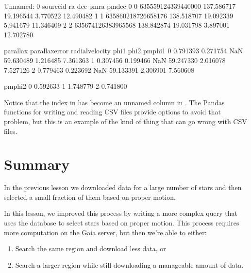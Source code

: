\documentclass[letterpaper,10pt,english]{sphinxmanual}
\begin{document}
\begin{sphinxVerbatim}[commandchars=\\\{\}]
   Unnamed: 0           source\PYGZus{}id          ra        dec      pmra      pmdec  \PYGZbs{}
0           0  635559124339440000  137.586717  19.196544 \PYGZhy{}3.770522 \PYGZhy{}12.490482   
1           1  635860218726658176  138.518707  19.092339 \PYGZhy{}5.941679 \PYGZhy{}11.346409   
2           2  635674126383965568  138.842874  19.031798 \PYGZhy{}3.897001 \PYGZhy{}12.702780   

   parallax  parallax\PYGZus{}error  radial\PYGZus{}velocity       phi1      phi2   pm\PYGZus{}phi1  \PYGZbs{}
0  0.791393        0.271754              NaN \PYGZhy{}59.630489 \PYGZhy{}1.216485 \PYGZhy{}7.361363   
1  0.307456        0.199466              NaN \PYGZhy{}59.247330 \PYGZhy{}2.016078 \PYGZhy{}7.527126   
2  0.779463        0.223692              NaN \PYGZhy{}59.133391 \PYGZhy{}2.306901 \PYGZhy{}7.560608   

    pm\PYGZus{}phi2  
0 \PYGZhy{}0.592633  
1  1.748779  
2 \PYGZhy{}0.741800  
\end{sphinxVerbatim}

Notice that the index in  has become an unnamed column in .  The Pandas functions for writing and reading CSV files provide options to avoid that problem, but this is an example of the kind of thing that can go wrong with CSV files.


\section{Summary}
\label{\detokenize{04_select:summary}}
In the previous lesson we downloaded data for a large number of stars and then selected a small fraction of them based on proper motion.

In this lesson, we improved this process by writing a more complex query that uses the database to select stars based on proper motion.  This process requires more computation on the Gaia server, but then we’re able to either:
\begin{enumerate}
%
\item {} 
Search the same region and download less data, or

\item {} 
Search a larger region while still downloading a manageable amount of data.

\end{enumerate}
\end{document}
